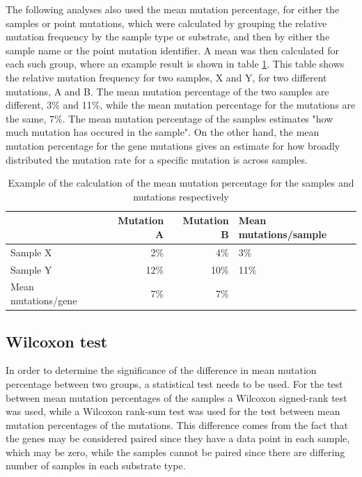 The following analyses also used the mean mutation percentage, for either the samples or point mutations, which were calculated by grouping the relative mutation frequency by the sample type or substrate, and then by either the sample name or the point mutation identifier. 
A mean was then calculated for each such group, where an example result is shown in table \ref{example_mean_table}. This table shows the relative mutation frequency for two samples, X and Y, for two different mutations, A and B. 
The mean mutation percentage of the two samples are different, 3\% and 11\%, while the mean mutation percentage for the mutations are the same, 7\%.
The mean mutation percentage of the samples estimates "how much mutation has occured in the sample". 
On the other hand, the mean mutation percentage for the gene mutations gives an estimate for how broadly distributed the mutation rate for a specific mutation is across samples.


\begin{table}[h]
    \caption{Example of the calculation of the mean mutation percentage for the samples and mutations respectively}
    \label{example_mean_table}
\begin{tabular}{@{}lrr|l@{}}
\toprule
               & Mutation A & Mutation B & Mean mutations/sample \\ \midrule
Sample X       & 2\%       & 4\%       & 3\%         \\
Sample Y       & 12\%       & 10\%       & 11\%         \\ \midrule
Mean mutations/gene & 7\%       & 7\%       &              \\ 
\bottomrule 
\end{tabular}
\end{table}

\subsection{Wilcoxon test}
In order to determine the significance of the difference in mean mutation percentage between two groups, a statistical test needs to be used. 
For the test between mean mutation percentages of the samples a Wilcoxon signed-rank test was used, while a Wilcoxon rank-sum test was used for the test between mean mutation percentages of the mutations. 
This difference comes from the fact that the genes may be considered paired since they have a data point in each sample, which may be zero, while the samples cannot be paired since there are differing number of samples in each substrate type.


